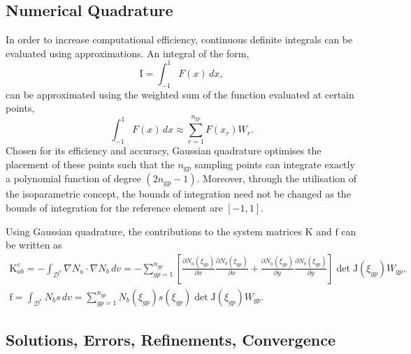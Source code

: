 \documentclass[../main.tex]{subfiles}
\begin{document}
\subsection{Numerical Quadrature}
In order to increase computational efficiency, continuous definite integrals can be evaluated using approximations. An integral of the form,
\begin{equation*}
    \mathrm{I} = \int^{1}_{-1} F(x) \,dx,
\end{equation*}
 can be approximated using the weighted sum of the function evaluated at certain points,
\begin{equation*}
    \int^{1}_{-1} F(x) \,dx \approx \sum^{n_{\text{gp}}}_{r=1} F(x_{r}) W_{r}.
\end{equation*}
Chosen for its efficiency and accuracy, Gaussian quadrature optimises the placement of these points such that the $n_{\text{gp}}$ sampling points can integrate
 exactly a polynomial function of degree $(2n_{\text{gp}}-1)$. Moreover, through the utilisation of the isoparametric concept, the bounds of integration need
 not be changed as the bounds of integration for the reference element are $[-1, 1]$.

Using Gaussian quadrature, the contributions to the system matrices $\boldsymbol{\mathrm{K}}$ and $\boldsymbol{\mathrm{f}}$
 can be written as 
 \begin{gather} \label{quadrature_matrices}
    \boldsymbol{\mathrm{K}}^{e}_{ab} = -\int_{\mathcal{D}^{e}} \nabla N_{a} \cdot \nabla N_{b} \, dv =
    - \sum^{n_{gp}}_{gp=1}\left[ \frac{\partial N_{a}(\xi_{gp})}{\partial x} \frac{\partial N_{b}(\xi_{gp})}{\partial x}
    + \frac{\partial N_{a}(\xi_{gp})}{\partial y} \frac{\partial N_{b}(\xi_{gp})}{\partial y}\right] \det \boldsymbol{\mathrm{J}}(\xi_{gp}) W_{gp}, \\
    \boldsymbol{\mathrm{f}} = \int_{\mathcal{D}^{e}} N_{b} s\, dv = \sum^{n_{gp}}_{gp=1} N_{b}(\xi_{gp}) s(\xi_{gp}) \det \boldsymbol{\mathrm{J}}(\xi_{gp}) W_{gp}.
 \end{gather}

\subsection{Solutions, Errors, Refinements, Convergence}
\end{document}
